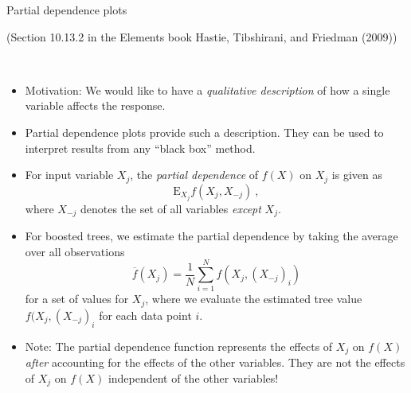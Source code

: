 \documentclass[
  10pt,
  ignorenonframetext,
]{beamer}
\providecommand{\tightlist}{%
  \setlength{\itemsep}{0pt}\setlength{\parskip}{0pt}}
\begin{document}
\begin{frame}
\begin{block}{Partial dependence plots}
\protect\hypertarget{partial-dependence-plots}{}
\scriptsize

(Section 10.13.2 in the Elements book Hastie, Tibshirani, and Friedman
(2009))

\normalsize

\(~\)

\begin{itemize}
\tightlist
\item
  Motivation: We would like to have a \emph{qualitative description} of
  how a single variable affects the response.
\end{itemize}

\vspace{3mm}

\begin{itemize}
\tightlist
\item
  Partial dependence plots provide such a description. They can be used
  to interpret results from any ``black box'' method.
\end{itemize}

\vspace{3mm}

\begin{itemize}
\tightlist
\item
  For input variable \(X_j\), the \emph{partial dependence} of \(f(X)\)
  on \(X_j\) is given as \[\text{E}_{X_j} f(X_j, X_{-j}) \ , \] where
  \(X_{-j}\) denotes the set of all variables \emph{except} \(X_j\).
\end{itemize}
\end{block}
\end{frame}

\begin{frame}
\vspace{2mm}

\begin{itemize}
\tightlist
\item
  For boosted trees, we estimate the partial dependence by taking the
  average over all observations
  \[\overline{f}(X_j) = \frac1N \sum_{i=1}^N f(X_{j},(X_{-j})_i)\] for a
  set of values for \(X_j\), where we evaluate the estimated tree value
  \(f(X_{j},(X_{-j})_i\) for each data point \(i\).
\end{itemize}

\vspace{4mm}

\begin{itemize}
\tightlist
\item
  Note: The partial dependence function represents the effects of
  \(X_j\) on \(f(X)\) \emph{after} accounting for the effects of the
  other variables. They are not the effects of \(X_j\) on \(f(X)\)
  independent of the other variables!
\end{itemize}

\normalsize
\end{frame}
\end{document}
